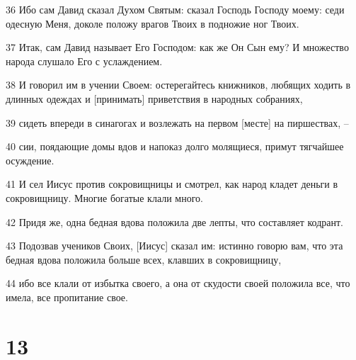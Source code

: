 \par 36 Ибо сам Давид сказал Духом Святым: сказал Господь Господу моему: седи одесную Меня, доколе положу врагов Твоих в подножие ног Твоих.
\par 37 Итак, сам Давид называет Его Господом: как же Он Сын ему? И множество народа слушало Его с услаждением.
\par 38 И говорил им в учении Своем: остерегайтесь книжников, любящих ходить в длинных одеждах и [принимать] приветствия в народных собраниях,
\par 39 сидеть впереди в синагогах и возлежать на первом [месте] на пиршествах, --
\par 40 сии, поядающие домы вдов и напоказ долго молящиеся, примут тягчайшее осуждение.
\par 41 И сел Иисус против сокровищницы и смотрел, как народ кладет деньги в сокровищницу. Многие богатые клали много.
\par 42 Придя же, одна бедная вдова положила две лепты, что составляет кодрант.
\par 43 Подозвав учеников Своих, [Иисус] сказал им: истинно говорю вам, что эта бедная вдова положила больше всех, клавших в сокровищницу,
\par 44 ибо все клали от избытка своего, а она от скудости своей положила все, что имела, все пропитание свое.

\chapter{13}

